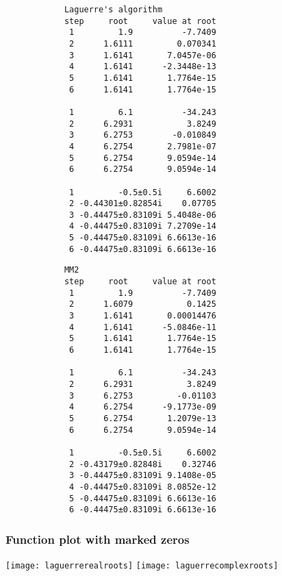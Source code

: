 \documentclass{article}
\begin{document}
	\begin{multicols}{2}
		\begin{verbatim}
			Laguerre's algorithm
			step     root     value at root
			 1         1.9          -7.7409
			 2      1.6111         0.070341
			 3      1.6141       7.0457e-06
			 4      1.6141      -2.3448e-13
			 5      1.6141       1.7764e-15
			 6      1.6141       1.7764e-15
			 
			 1         6.1          -34.243
			 2      6.2931           3.8249
			 3      6.2753        -0.010849
			 4      6.2754       2.7981e-07
			 5      6.2754       9.0594e-14
			 6      6.2754       9.0594e-14
			 
			 1         -0.5±0.5i     6.6002
			 2 -0.44301±0.82854i    0.07705
			 3 -0.44475±0.83109i 5.4048e-06
			 4 -0.44475±0.83109i 7.2709e-14
			 5 -0.44475±0.83109i 6.6613e-16
			 6 -0.44475±0.83109i 6.6613e-16
		\end{verbatim}
		\begin{verbatim}
			MM2
			step     root     value at root
			 1         1.9          -7.7409
			 2      1.6079           0.1425
			 3      1.6141       0.00014476
			 4      1.6141      -5.0846e-11
			 5      1.6141       1.7764e-15
			 6      1.6141       1.7764e-15
			 
			 1         6.1          -34.243
			 2      6.2931           3.8249
			 3      6.2753         -0.01103
			 4      6.2754      -9.1773e-09
			 5      6.2754       1.2079e-13
			 6      6.2754       9.0594e-14
			 
			 1         -0.5±0.5i     6.6002
			 2 -0.43179±0.82848i    0.32746
			 3 -0.44475±0.83109i 9.1408e-05
			 4 -0.44475±0.83109i 8.0852e-12
			 5 -0.44475±0.83109i 6.6613e-16
			 6 -0.44475±0.83109i 6.6613e-16
		\end{verbatim}
	\end{multicols}
	
	\subsubsection{Function plot with marked zeros}
	
	\texttt{[image: laguerrerealroots]}
	\texttt{[image: laguerrecomplexroots]}
	
\end{document}
